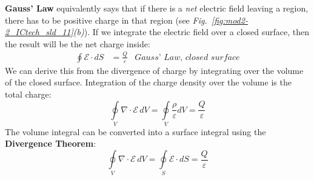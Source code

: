 \textbf{Gauss’ Law} equivalently says that if there is a \textit{net} electric field leaving a region, there has to be positive charge in that region (see \emph{Fig.~\ref{fig:mod2-2_ICtech_sld_11}(b)}).  If we integrate the electric field over a closed surface, then the result will be the net charge inside:
    \begin{align}
    	\oint {\mathcal{E} \cdot dS} &= \frac{Q}{\varepsilon} &\textit{Gauss' Law, closed surface}
    \end{align}
We can derive this from the divergence of charge by integrating over the volume of the closed surface.  Integration of the charge density over the volume is the total charge:
    \begin{equation}
        \oint\limits_V {\nabla \cdot \mathcal{E}\,dV =} \oint\limits_V {\frac{\rho}{\varepsilon}dV = \frac{Q}{\varepsilon}} 
    \end{equation}
The volume integral can be converted into a surface integral using the \textbf{Divergence Theorem}:
    \begin{equation} 
        \oint\limits_V {\nabla \cdot \mathcal{E}\,dV = } \oint\limits_S {\mathcal{E} \cdot dS = } \frac{Q}{\varepsilon}
    \end{equation}
